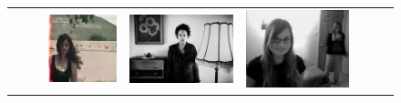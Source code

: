 \begin{figure}
\begin{tabular}{m{.01\linewidth} m{.16\linewidth} m{.16\linewidth} m{.16\linewidth} m{.16\linewidth} m{.16\linewidth}}
    \includegraphics[width=\linewidth]{../style/figures/flickr_on_flickr/pred_style_Melancholy/1.jpg} &
    \includegraphics[width=\linewidth]{../style/figures/flickr_on_flickr/pred_style_Melancholy/2.jpg} &
    \includegraphics[width=\linewidth]{../style/figures/flickr_on_flickr/pred_style_Melancholy/3.jpg} &

\end{tabular}
\end{figure}

